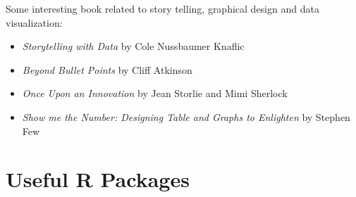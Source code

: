 \documentclass[
]{krantz}
\providecommand{\tightlist}{%
  \setlength{\itemsep}{0pt}\setlength{\parskip}{0pt}}
\begin{document}
Some interesting book related to story telling, graphical design and data visualization:

\begin{itemize}
\tightlist
\item
  \emph{Storytelling with Data} by Cole Nussbaumer Knaflic
\item
  \emph{Beyond Bullet Points} by Cliff Atkinson
\item
  \emph{Once Upon an Innovation} by Jean Storlie and Mimi Sherlock
\item
  \emph{Show me the Number: Designing Table and Graphs to Enlighten} by Stephen Few
\end{itemize}

\hypertarget{useful-r-packages}{%
\section{Useful R Packages}\label{useful-r-packages}}
\end{document}
